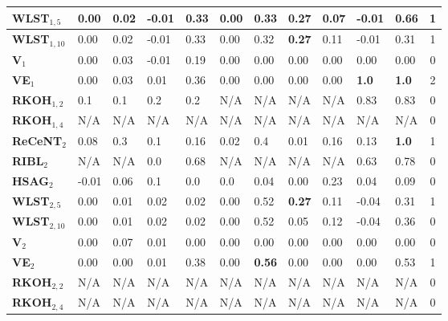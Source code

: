 \begin{table*}[t]
\begin{center}
\begin{tabular}[t]{|p{1.3cm}|p{0.6cm}|p{0.6cm}|p{0.6cm}|p{0.5cm}|p{0.5cm}|p{0.5cm}|p{0.5cm}|p{0.6cm}|p{0.6cm}|p{0.6cm}|c|}
	\hline
	\textbf{WLST$_{1,5}$}    & 0.00 & 0.02        &    -0.01    	&   0.33     &    0.00 	 & 0.33 & \textbf{0.27} & 0.07  & -0.01 & 0.66 & 1      \\
	\hline
	\textbf{WLST$_{1,10}$}    & 0.00 & 0.02      &   -0.01    & 0.33        &   0.00  & 0.32  & \textbf{0.27} & 0.11 & -0.01 & 0.31 & 1       \\
	\hline
	\textbf{V$_1$}    & 0.00  & 0.03         &   -0.01       	&   0.19      &   0.00    	 &  0.00   & 0.00 & 0.00  & 0.00 & 0.00 & 0     \\
	\hline
	\textbf{VE$_1$}    & 0.00 & 0.03         &     0.01   	& 0.36         &  0.00 	 & 0.00   &0.00  & 0.00 & \textbf{1.0}  &  \textbf{1.0} & 2     \\
	\hline
	\textbf{RKOH$_{1,2}$}    & 0.1 & 0.1         &  0.2      	&   0.2       &  N/A 	 & N/A   & N/A  & N/A 			& 0.83  &  0.83 & 0    \\
	\hline
	\textbf{RKOH$_{1,4}$}    & N/A & N/A         &     N/A   	& N/A         &  N/A 	 & N/A   & N/A  & N/A 			&  N/A  & N/A & 0     \\
	\hline				
	\hline	
	\textbf{ReCeNT$_2$}    &  0.08  & 0.3    & 0.1	 	&  0.16  	    	  &  0.02   &  0.4 & 0.01 & 0.16 & 0.13 & \textbf{1.0} & 1 \\
	\hline
	\textbf{RIBL$_2$}    &  N/A            &   N/A		     &   0.0			&  0.68    &  N/A              &  N/A      & N/A & N/A   & 0.63 & 0.78 & 0   \\
	\hline	
	\textbf{HSAG$_2$}    &  -0.01          &   0.06	         &   0.1     	 	&  0.0          	  &  0.0       	  	  &  0.04      & 0.00 & 0.23  & 0.04 & 0.09 & 0  \\
	\hline
	\textbf{WLST$_{2,5}$}    &     0.00    &   0.01      &   0.02	 	&  0.02        	  &     0.00 &  0.52  & \textbf{0.27} & 0.11   & -0.04 & 0.31 & 1  \\
	\hline
	\textbf{WLST$_{2,10}$}    &      0.00      &  0.01       &   	 0.02	&  0.02        	  &     0.00  &  0.52  & 0.05 & 0.12  & -0.04 & 0.36 & 0   \\
	\hline
	\textbf{V$_2$}    &    0.00     &   0.07     &     0.01 	 	&   0.00      	  &       0.00	  & 0.00 & 0.00 & 0.00  & 0.00 & 0.00 & 0  \\
	\hline
	\textbf{VE$_2$}    & 0.00   &  0.00          &   0.01 	 	&  0.38   	  &   0.00  	  & \textbf{0.56}    & 0.00 & 0.00  & 0.00 & 0.53 & 1   \\
	\hline
	\textbf{RKOH$_{2,2}$}    & N/A  & N/A         &  N/A      	& N/A         &  N/A 	 & N/A   & N/A  & N/A 			& N/A  & N/A & 0     \\
	\hline
	\textbf{RKOH$_{2,4}$}    & N/A & N/A         &     N/A   	& N/A         &  N/A 	 & N/A   & N/A  & N/A 			&  N/A  & N/A & 0   \\
	\hline	
\end{tabular} 

\label{tab:Results}

\end{center}
\end{table*}



